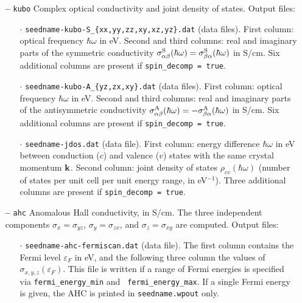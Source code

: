 \begin{itemize}


\item[{\bf --}] \verb#kubo# Complex optical conductivity and joint
  density of states. Output files:

\begin{itemize}

\item[$\cdot$] {\tt seedname-kubo-S\_{\{xx,yy,zz,xy,xz,yz\}.dat}}
  (data files).  First column: optical frequency $\hbar\omega$ in
  eV. Second and third columns: real and imaginary parts of the
  symmetric conductivity $\sigma^{\rm
    S}_{\alpha\beta}(\hbar\omega)=\sigma^{\rm
    S}_{\beta\alpha}(\hbar\omega)$ in S/cm. Six additional columns are
  present if {\tt spin\_decomp = true}.

\item[$\cdot$] {\tt seedname-kubo-A\_{\{yz,zx,xy\}.dat}} (data files).
  First column: optical frequency $\hbar\omega$ in eV. Second and
  third columns: real and imaginary parts of the antisymmetric
  conductivity $\sigma^{\rm A}_{\alpha\beta}(\hbar\omega)=-\sigma^{\rm
    A}_{\beta\alpha}(\hbar\omega)$ in S/cm. Six additional columns are
  present if {\tt spin\_decomp = true}.


\item[$\cdot$] {\tt seedname-jdos.dat} (data file).  First column:
  energy difference $\hbar\omega$ in eV between conduction ($c$) and
  valence ($v$) states with the same crystal momentum ${\bf
    k}$. Second column: joint density of states
  $\rho_{cv}(\hbar\omega)$ (number of states per unit cell per unit
  energy range, in eV$^{-1}$). Three additional columns are present if
  {\tt spin\_decomp = true}.


\end{itemize}

\item[{\bf --}] \verb#ahc# Anomalous Hall conductivity, in S/cm.  The
  three independent components $\sigma_x=\sigma_{yz}$,
  $\sigma_y=\sigma_{zx}$, and $\sigma_z=\sigma_{xy}$ are
  computed. Output files:

\begin{itemize}

\item[$\cdot$] {\tt seedname-ahc-fermiscan.dat} (data file). The
  first column contains the Fermi level $\varepsilon_F$ in eV, and the
  following three column the values of
  $\sigma_{x,y,z}(\varepsilon_F)$.  This file is written if a range of
  Fermi energies is specified via {\tt fermi\_energy\_min} and {\tt
    fermi\_energy\_max}.  If a single Fermi energy is given, the AHC
  is printed in {\tt seedname.wpout} only.


\end{itemize}
\end{itemize}
